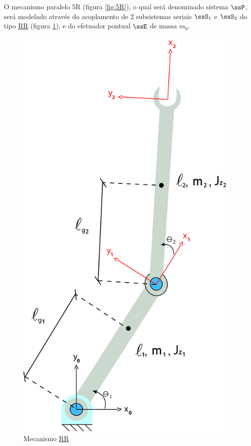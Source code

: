 \documentclass[]{politex}
\begin{document}
O mecanismo paralelo 5R (figura \ref{fig:5R}), o qual será denominado sistema $\ssP$, será modelado através do acoplamento de 2 subsistemas seriais $\ssS_1$ e $\ssS_2$ do tipo \underline{R}\underline{R} (figura \ref{fig:RR}), e do efetuador pontual $\ssE$ de massa $m_0$.

\begin{figure}[h]
	\centering
	\includegraphics[scale=0.065]{../figures/RR.jpg}  
	\caption{Mecanismo \underline{R}\underline{R}}
	\label{fig:RR}
\end{figure}
\end{document}
